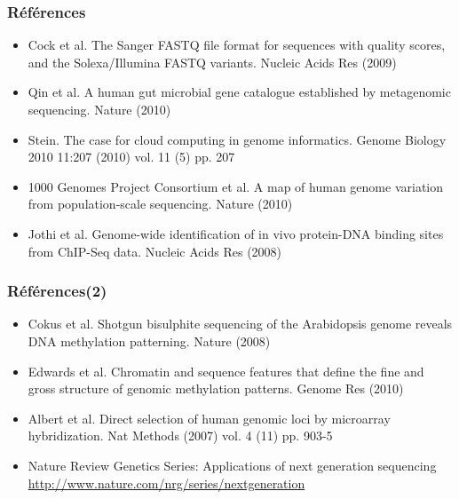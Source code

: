 \documentclass{beamer}
\begin{document}
\begin{frame}
	\frametitle{Références}
\begin{itemize}
	\item Cock et al. The Sanger FASTQ file format for sequences with quality scores, and the Solexa/Illumina FASTQ variants. Nucleic Acids Res (2009)
	\item Qin et al. A human gut microbial gene catalogue established by metagenomic sequencing. Nature (2010)
	\item Stein. The case for cloud computing in genome informatics. Genome Biology 2010 11:207 (2010) vol. 11 (5) pp. 207
	\item 1000 Genomes Project Consortium et al. A map of human genome variation from population-scale sequencing. Nature (2010)
	
\item Jothi et al. Genome-wide identification of in vivo protein-DNA binding sites from ChIP-Seq data. Nucleic Acids Res (2008)



\end{itemize}
\end{frame}

\begin{frame}
	\frametitle{Références(2)}
\begin{itemize}
	\item Cokus et al. Shotgun bisulphite sequencing of the Arabidopsis genome reveals DNA methylation patterning. Nature (2008)
	\item Edwards et al. Chromatin and sequence features that define the fine and gross structure of genomic methylation patterns. Genome Res (2010)
	\item Albert et al. Direct selection of human genomic loci by microarray hybridization. Nat Methods (2007) vol. 4 (11) pp. 903-5
	\item Nature Review Genetics Series: Applications of next generation sequencing\\ \small{\url{http://www.nature.com/nrg/series/nextgeneration}}
\end{itemize}
\end{frame}
\end{document}
